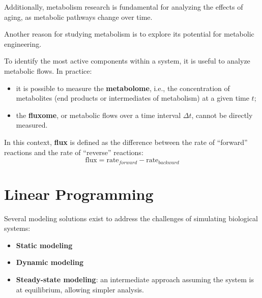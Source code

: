 Additionally, metabolism research is fundamental for analyzing the effects of aging, as 
metabolic pathways change over time.

Another reason for studying metabolism is to explore its potential for metabolic engineering.

To identify the most active components within a system, it is useful to analyze metabolic flows. 
In practice:
\begin{itemize}
    \item it is possible to measure the \textbf{metabolome}, i.e., the concentration of metabolites 
        (end products or intermediates of metabolism) at a given time $t$;
    \item the \textbf{fluxome}, or metabolic flows over a time interval $\Delta t$, cannot be 
        directly measured.
\end{itemize}

\begin{definition}
In this context, \textbf{flux} is defined as the difference between the rate of “forward” reactions 
and the rate of “reverse” reactions:
\begin{equation}
    \text{flux} = \text{rate}_{forward} - \text{rate}_{backward}
\end{equation}
\end{definition}

\section{Linear Programming}

Several modeling solutions exist to address the challenges of simulating biological systems:
\begin{itemize}
    \item \textbf{Static modeling}
    \item \textbf{Dynamic modeling}
    \item \textbf{Steady-state modeling}: an intermediate approach assuming the system is at 
        equilibrium, allowing simpler analysis.
\end{itemize}


